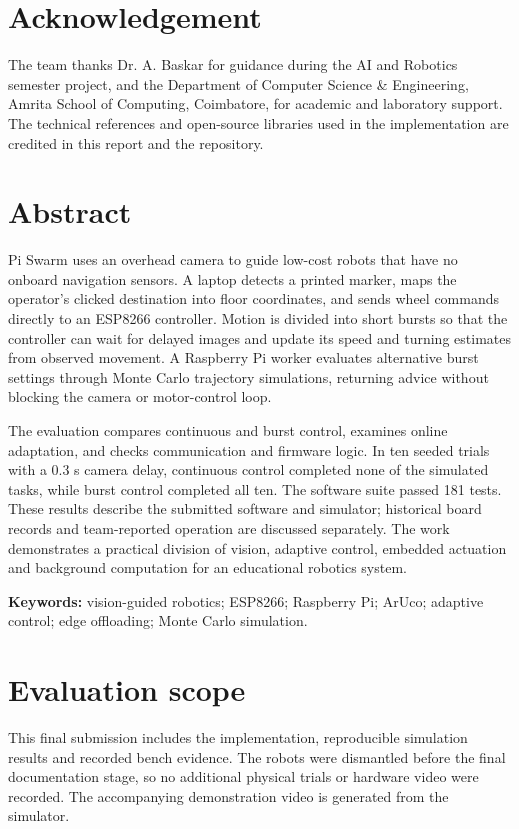 \documentclass[11pt,a4paper]{article}
\begin{document}
\section*{Acknowledgement}
The team thanks Dr. A. Baskar for guidance during the AI and Robotics semester
project, and the Department of Computer Science \& Engineering, Amrita School of
Computing, Coimbatore, for academic and laboratory support. The technical references
and open-source libraries used in the implementation are credited in this report
and the repository.

\section*{Abstract}
Pi Swarm uses an overhead camera to guide low-cost robots that have no onboard
navigation sensors. A laptop detects a printed marker, maps the operator's clicked
destination into floor coordinates, and sends wheel commands directly to an
ESP8266 controller. Motion is divided into short bursts so that the controller
can wait for delayed images and update its speed and turning estimates from
observed movement. A Raspberry Pi worker evaluates alternative burst settings
through Monte Carlo trajectory simulations, returning advice without blocking
the camera or motor-control loop.

The evaluation compares continuous and burst control, examines online adaptation,
and checks communication and firmware logic. In ten seeded trials with a 0.3 s
camera delay, continuous control completed none of the simulated tasks, while
burst control completed all ten. The software suite passed 181 tests. These
results describe the submitted software and simulator; historical board records
and team-reported operation are discussed separately. The work demonstrates a
practical division of vision, adaptive control, embedded actuation and background
computation for an educational robotics system.

\textbf{Keywords:} vision-guided robotics; ESP8266; Raspberry Pi; ArUco; adaptive
control; edge offloading; Monte Carlo simulation.

\section*{Evaluation scope}
This final submission includes the implementation, reproducible simulation
results and recorded bench evidence. The robots were dismantled before the final
documentation stage, so no additional physical trials or hardware video were
recorded. The accompanying demonstration video is generated from the simulator.
\end{document}
